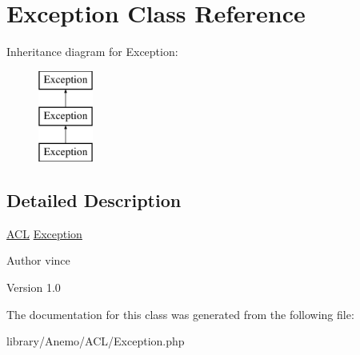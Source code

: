 \hypertarget{class_anemo_1_1_a_c_l_1_1_exception}{
\section{Exception Class Reference}
\label{class_anemo_1_1_a_c_l_1_1_exception}
}
Inheritance diagram for Exception:\begin{figure}[H]
\begin{center}
\leavevmode
\includegraphics[height=3.000000cm]{class_anemo_1_1_a_c_l_1_1_exception}
\end{center}
\end{figure}


\subsection{Detailed Description}
\hyperlink{class_anemo_1_1_a_c_l}{ACL} \hyperlink{class_anemo_1_1_a_c_l_1_1_exception}{Exception} \begin{DoxyAuthor}{Author}
vince 
\end{DoxyAuthor}
\begin{DoxyVersion}{Version}
1.0 
\end{DoxyVersion}


The documentation for this class was generated from the following file:\begin{DoxyCompactItemize}
\item 
library/Anemo/ACL/Exception.php\end{DoxyCompactItemize}
